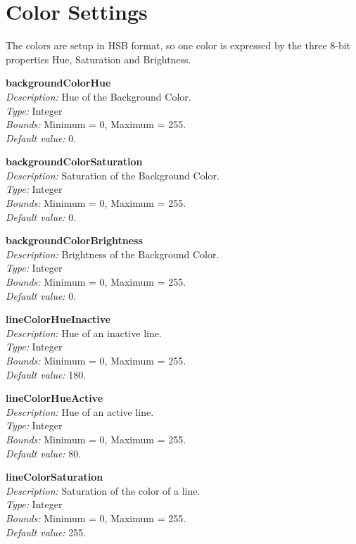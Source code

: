 \documentclass[12pt,a4paper,titlepage,oneside]{report}
\begin{document}
\section{Color Settings}

The colors are setup in HSB format, so one color is expressed by the three 8-bit properties Hue, Saturation and Brightness.

\noindent
\textbf{backgroundColorHue} \\
\emph{Description:} Hue of the Background Color. \\
\emph{Type:} Integer \\
\emph{Bounds:} Minimum = 0, Maximum = 255. \\
\emph{Default value:} 0.

\noindent
\textbf{backgroundColorSaturation} \\
\emph{Description:} Saturation of the Background Color. \\
\emph{Type:} Integer \\
\emph{Bounds:} Minimum = 0, Maximum = 255. \\
\emph{Default value:} 0.

\noindent
\textbf{backgroundColorBrightness} \\
\emph{Description:} Brightness of the Background Color. \\
\emph{Type:} Integer \\
\emph{Bounds:} Minimum = 0, Maximum = 255. \\
\emph{Default value:} 0.

\noindent
\textbf{lineColorHueInactive} \\
\emph{Description:} Hue of an inactive line. \\
\emph{Type:} Integer \\
\emph{Bounds:} Minimum = 0, Maximum = 255. \\
\emph{Default value:} 180.

\noindent
\textbf{lineColorHueActive} \\
\emph{Description:} Hue of an active line. \\
\emph{Type:} Integer \\
\emph{Bounds:} Minimum = 0, Maximum = 255. \\
\emph{Default value:} 80.

\noindent
\textbf{lineColorSaturation} \\
\emph{Description:} Saturation of the color of a line. \\
\emph{Type:} Integer \\
\emph{Bounds:} Minimum = 0, Maximum = 255. \\
\emph{Default value:} 255.
\end{document}
